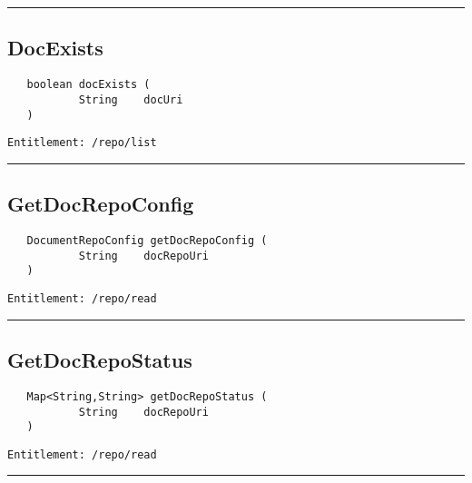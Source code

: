 \rule{12cm}{2pt}
\subsection{DocExists}
\label{Api:DocExists}
\begin{verbatim}
   boolean docExists (
           String    docUri
   )
\end{verbatim}
\begin{Verbatim}[fontsize=\small, formatcom=\color{Maroon}]
  Entitlement: /repo/list
\end{Verbatim}



\rule{12cm}{2pt}
\subsection{GetDocRepoConfig}
\label{Api:GetDocRepoConfig}
\begin{verbatim}
   DocumentRepoConfig getDocRepoConfig (
           String    docRepoUri
   )
\end{verbatim}
\begin{Verbatim}[fontsize=\small, formatcom=\color{Maroon}]
  Entitlement: /repo/read
\end{Verbatim}



\rule{12cm}{2pt}
\subsection{GetDocRepoStatus}
\label{Api:GetDocRepoStatus}
\begin{verbatim}
   Map<String,String> getDocRepoStatus (
           String    docRepoUri
   )
\end{verbatim}
\begin{Verbatim}[fontsize=\small, formatcom=\color{Maroon}]
  Entitlement: /repo/read
\end{Verbatim}



\rule{12cm}{2pt}
